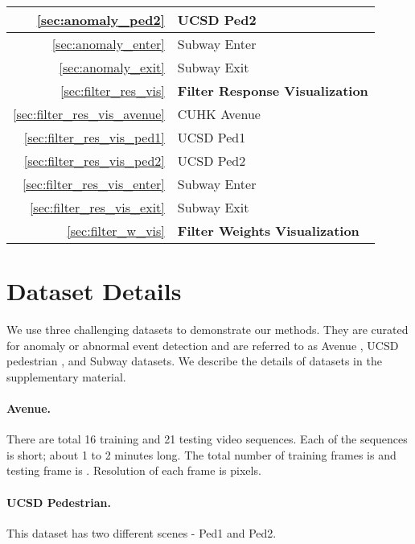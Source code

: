 \documentclass[10pt,twocolumn,letterpaper]{article}
\begin{document}
\begin{table*}[h]
\begin{tabular}{|r|p{12cm}|}
		\hline
		\ref{sec:anomaly_ped2} & UCSD Ped2 \\
		\hline
		\ref{sec:anomaly_enter} & Subway Enter \\
		\hline
		\ref{sec:anomaly_exit} & Subway Exit \\
		\hline \hline
		\ref{sec:filter_res_vis} & {\bf Filter Response Visualization} \\
		\hline
		\ref{sec:filter_res_vis_avenue} & CUHK Avenue\\
		\hline
		\ref{sec:filter_res_vis_ped1} & UCSD Ped1 \\
		\hline
		\ref{sec:filter_res_vis_ped2} & UCSD Ped2 \\
		\hline
		\ref{sec:filter_res_vis_enter} & Subway Enter \\
		\hline
		\ref{sec:filter_res_vis_exit} & Subway Exit \\
		\hline \hline
		\ref{sec:filter_w_vis}  & {\bf Filter Weights Visualization} \\
		\hline
	\end{tabular}
\end{table*}

\clearpage



\section{Dataset Details}
\label{sec:datasets}

We use three challenging datasets to demonstrate our methods. 
They are curated for anomaly or abnormal event detection and are referred to as Avenue \cite{lu2013abnormal}, UCSD pedestrian \cite{mahadevan2010anomaly}, and Subway \cite{adam2008robust} datasets.
We describe the details of datasets in the supplementary material.

\paragraph{\bf Avenue.}
There are total 16 training and 21 testing video sequences. 
Each of the sequences is short; about 1 to 2 minutes long.
The total number of training frames is  and testing frame is . 
Resolution of each frame is  pixels. 


\paragraph{\bf UCSD Pedestrian.}
This dataset has two different scenes - Ped1 and Ped2.
\end{document}
